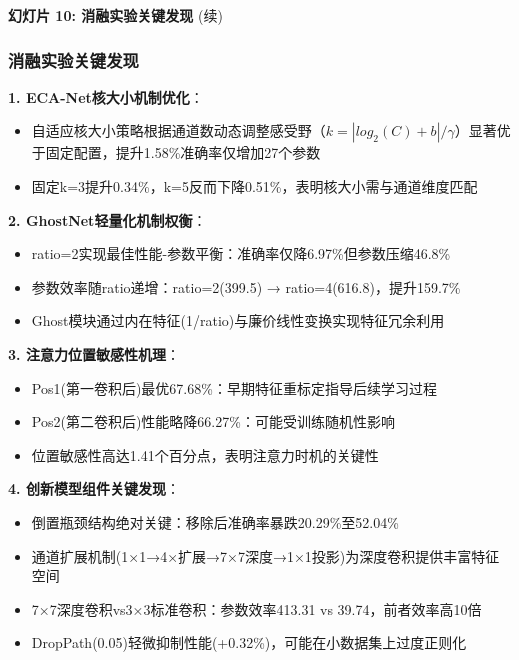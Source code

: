 \documentclass[10pt]{beamer}
\begin{document}
\begin{frame}{\textbf{幻灯片 10: 消融实验关键发现} (续)}
\frametitle{消融实验关键发现}

\vspace{-0.5em}
{\scriptsize

\textbf{1. ECA-Net核大小机制优化}：
\begin{itemize}
    \item 自适应核大小策略根据通道数动态调整感受野（$k = |log_2(C) + b|/\gamma$）显著优于固定配置，提升1.58\%准确率仅增加27个参数
    \item 固定k=3提升0.34\%，k=5反而下降0.51\%，表明核大小需与通道维度匹配
\end{itemize}

\textbf{2. GhostNet轻量化机制权衡}：
\begin{itemize}
    \item ratio=2实现最佳性能-参数平衡：准确率仅降6.97\%但参数压缩46.8\%
    \item 参数效率随ratio递增：ratio=2(399.5) → ratio=4(616.8)，提升159.7\%
    \item Ghost模块通过内在特征(1/ratio)与廉价线性变换实现特征冗余利用
\end{itemize}

\textbf{3. 注意力位置敏感性机理}：
\begin{itemize}
    \item Pos1(第一卷积后)最优67.68\%：早期特征重标定指导后续学习过程
    \item Pos2(第二卷积后)性能略降66.27\%：可能受训练随机性影响
    \item 位置敏感性高达1.41个百分点，表明注意力时机的关键性
\end{itemize}

\textbf{4. 创新模型组件关键发现}：
\begin{itemize}
    \item 倒置瓶颈结构绝对关键：移除后准确率暴跌20.29\%至52.04\%
    \item 通道扩展机制(1×1→4×扩展→7×7深度→1×1投影)为深度卷积提供丰富特征空间
    \item 7×7深度卷积vs3×3标准卷积：参数效率413.31 vs 39.74，前者效率高10倍
    \item DropPath(0.05)轻微抑制性能(+0.32\%)，可能在小数据集上过度正则化
\end{itemize}}

\end{frame}
\end{document}
